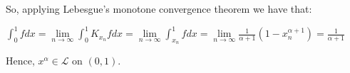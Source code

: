\documentclass{book}
\newenvironment{myIndent}{%
   \begin{adjustwidth}{2.5em}{0em}%
}{%
   \end{adjustwidth}%
}
\newcommand{\retTwo}{\hfill\bigbreak}
\begin{document}
\begin{itemize}
{\begin{myIndent}
      So, applying Lebesgue's monotone convergence theorem we have that:
      
      {\centering $\int_0^1 fdx = \lim\limits_{n\rightarrow \infty}\int_{0}^1 K_{x_n}f dx = \lim\limits_{n\rightarrow \infty} \int_{x_n}^1 fdx = \lim\limits_{n\rightarrow \infty}\frac{1}{\alpha + 1}\left(1 - x_n^{\alpha + 1}\right) = \frac{1}{\alpha + 1}$ \retTwo\par}

      Hence, $x^\alpha \in \mathscr{L}$ on $(0, 1)$.
   \end{myIndent}}
\end{itemize}
\end{document}
